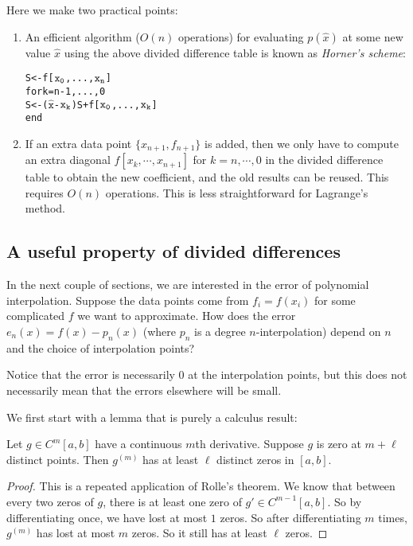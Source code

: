 \documentclass[a4paper]{article}
\begin{document}
Here we make two practical points:
\begin{enumerate}
  \item An efficient algorithm ($O(n)$ operations) for evaluating $p(\hat{x})$ at some new value $\hat{x}$ using the above divided difference table is known as \emph{Horner's scheme}:
    \begin{alltt}
      S <- f[\(\mathtt{x\sb{0}}\),..., \(\mathtt{x\sb{n}}\)]
      for k = n - 1,..., 0
          S <- (\(\mathtt{\hat{x}}\) - \(\mathtt{x\sb{k}}\))S + f[\(\mathtt{x\sb{0}}\),..., \(\mathtt{x\sb{k}}\)]
      end
    \end{alltt}
  \item If an extra data point $\{x_{n + 1}, f_{n + 1}\}$ is added, then we only have to compute an extra diagonal $f[x_k, \cdots, x_{n + 1}]$ for $k =n, \cdots, 0$ in the divided difference table to obtain the new coefficient, and the old results can be reused. This requires $O(n)$ operations. This is less straightforward for Lagrange's method.
\end{enumerate}

\subsection{A useful property of divided differences}
In the next couple of sections, we are interested in the error of polynomial interpolation. Suppose the data points come from $f_i = f(x_i)$ for some complicated $f$ we want to approximate. How does the error $e_n(x) = f(x) - p_n(x)$ (where $p_n$ is a degree $n$-interpolation) depend on $n$ and the choice of interpolation points?

Notice that the error is necessarily $0$ at the interpolation points, but this does not necessarily mean that the errors elsewhere will be small.

We first start with a lemma that is purely a calculus result:
\begin{lemma}
  Let $g \in C^m[a, b]$ have a continuous $m$th derivative. Suppose $g$ is zero at $m + \ell$ distinct points. Then $g^{(m)}$ has at least $\ell$ distinct zeros in $[a, b]$.
\end{lemma}

\begin{proof}
  This is a repeated application of Rolle's theorem. We know that between every two zeros of $g$, there is at least one zero of $g' \in C^{m - 1}[a, b]$. So by differentiating once, we have lost at most $1$ zeros. So after differentiating $m$ times, $g^{(m)}$ has lost at most $m$ zeros. So it still has at least $\ell$ zeros.
\end{proof}
\end{document}
